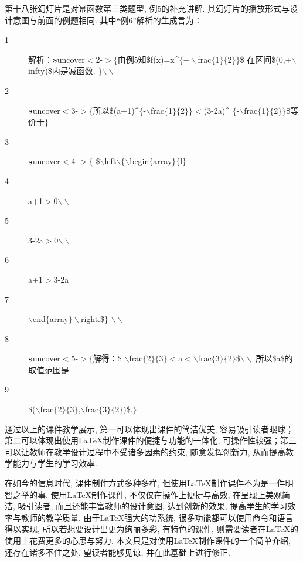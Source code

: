 第十八张幻灯片是对幂函数第三类题型, 例5的补充讲解. 其幻灯片的播放形式与设计意图与前面的例题相同. 其中“例6”解析的生成言为：
\begin{description}
  \item[1] 解析：${\mathbf s}$uncover$<$2-$>\{$由例5知\$f(x)=x\^{}$\{-\backslash$frac$\{$1$\}\{$2$\}\}$\$
      在区间\$(0,+$\backslash$infty)\$内是减函数. $\}$$\backslash\backslash$
  \item[2]${\mathbf s}$uncover$<$3-$>\{$所以\$(a+1)\^{}$\{$-$\backslash$frac$\{$1$\}\{$2$\}\}<$(3-2a)\^{}
     $\{$-$\backslash$frac$\{$1$\}\{$2$\}\}$\$等价于$\}$
  \item[3]${\mathbf s}$uncover$<$4-$>\{$ \$$\backslash$left$\backslash\{\backslash$begin$\{$array$\}\{$l$\}$
  \item[4]  a+1$>$0$\backslash\backslash$
  \item[5] 3-2a$>$0$\backslash\backslash$
  \item[6] a+1$>$3-2a
  \item[7] $\backslash$end$\{$array$\}\backslash$right.\$$\}$ $\backslash\backslash$
  \item[8]${\mathbf s}$uncover$<$5-$>\{$解得：\$
     $\backslash$frac$\{$2$\}\{$3$\}<$a$<\backslash$frac$\{$3$\}\{$2$\}$\$$\backslash\backslash$
      所以\$a\$的取值范围是
  \item[9] \$($\backslash$frac$\{$2$\}\{$3$\}$,$\backslash$frac$\{$3$\}\{$2$\}$)\$.$\}$
\end{description}


通过以上的课件教学展示, 第一可以体现出课件的简洁优美, 容易吸引读者眼球；第二可以体现出使用\LaTeX{}制作课件的便捷与功能的一体化, 可操作性较强；第三可以让教师在教学设计过程中不受诸多因素的约束, 随意发挥创新力, 从而提高教学能力与学生的学习效率.


在如今的信息时代, 课件制作方式多种多样, 但使用\LaTeX{}制作课件不为是一件明智之举的事. 使用\LaTeX{}制作课件, 不仅仅在操作上便捷与高效, 在呈现上美观简洁, 吸引读者, 而且还能丰富教师的设计意图, 达到创新的效果, 提高学生的学习效率与教师的教学质量. 由于\LaTeX{}强大的功系统, 很多功能都可以使用命令和语言得以实现, 所以若想要设计出更为绚丽多彩, 有特色的课件, 则需要读者在\LaTeX{}的使用上花费更多的心思与努力. 本文只是对使用\LaTeX{}制作课件的一个简单介绍, 还存在诸多不住之处, 望读者能够见谅, 并在此基础上进行修正.
